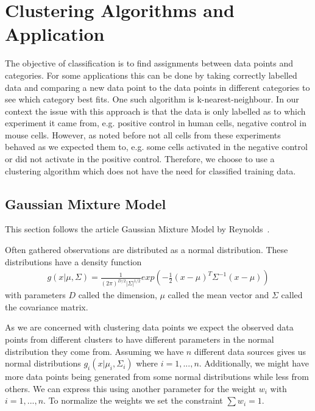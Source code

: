 \chapter{Clustering Algorithms and Application}
\label{chapter:clustering}

The objective of classification is to find assignments between data points and categories. For some applications this can be done by taking correctly labelled data and comparing a new data point to the data points in different categories to see which category best fits. One such algorithm is k-nearest-neighbour. In our context the issue with this approach is that the data is only labelled as to which experiment it came from, e.g. positive control in human cells, negative control in mouse cells. However, as noted before not all cells from these experiments behaved as we expected them to, e.g. some cells activated in the negative control or did not activate in the positive control. Therefore, we choose to use a clustering algorithm which does not have the need for classified training data.

\section{Gaussian Mixture Model}
\label{sec:gaussian_mixture_model}

This section follows the article Gaussian Mixture Model by Reynolds~\cite{reynolds2009}.

Often gathered observations are distributed as a normal distribution. These distributions have a density function
\begin{align*}
	g(x|\mu, \Sigma) = \frac{1}{(2\pi)^{D/2} |\Sigma|^{1/2}} exp\left( - \frac{1}{2} (x-\mu)^T \Sigma^{-1} (x-\mu) \right)
\end{align*}
with parameters $D$ called the dimension, $\mu$ called the mean vector and $\Sigma$ called the covariance matrix.

As we are concerned with clustering data points we expect the observed data points from different clusters to have different parameters in the normal distribution they come from. Assuming we have $n$ different data sources gives us normal distributions $g_i(x|\mu_i, \Sigma_i)$ where $i=1, ..., n$. Additionally, we might have more data points being generated from some normal distributions while less from others. We can express this using another parameter for the weight $w_i$ with $i=1, ..., n$. To normalize the weights we set the constraint $\sum w_i = 1$.

